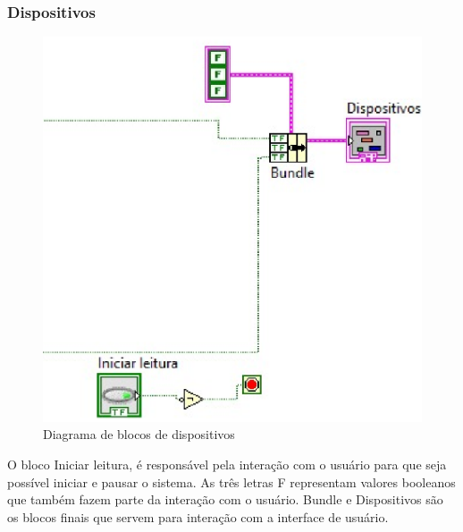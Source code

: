 \subsubsection{Dispositivos}

\begin{figure}[!htb]                                                               
    \centering                                                                      
    \includegraphics[scale=0.4, keepaspectratio=true]{figuras/detalhado/_bundle.eps} 
    \caption{Diagrama de blocos de dispositivos}
 \end{figure}

O bloco Iniciar leitura, é responsável pela interação com o usuário para que seja possível iniciar e pausar o sistema. As três letras F representam valores booleanos que também fazem parte da interação com o usuário.
    Bundle e Dispositivos são os blocos finais que servem para interação com a interface de usuário.


